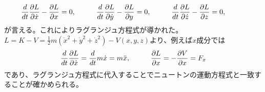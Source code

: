 \documentclass{jsarticle}
\begin{document}
\[\frac{d}{dt}\frac{\partial L}{\partial\dot{x}}-\frac{\partial L}{\partial x}=0,\hspace{10mm}\frac{d}{dt}\frac{\partial L}{\partial\dot{y}}-\frac{\partial L}{\partial y}=0,\hspace{10mm}\frac{d}{dt}\frac{\partial L}{\partial\dot{z}}-\frac{\partial L}{\partial z}=0,\hspace{10mm}\]
が言える。これによりラグランジュ方程式が導かれた。\\
\(\displaystyle L=K-V=\frac{1}{2}m(\dot{x}^{2}+\dot{y}^{2}+\dot{z}^{2})-V(x,y,z)\)より、例えば\(x\)成分では
\[\frac{d}{dt}\frac{\partial L}{\partial\dot{x}}=\frac{d}{dt}m\dot{x}=m\ddot{x},\hspace{10mm}\frac{\partial L}{\partial x}=-\frac{\partial V}{\partial x}=F_{x}\]
であり、ラグランジュ方程式に代入することでニュートンの運動方程式と一致することが確かめられる。
\\
\end{document}

